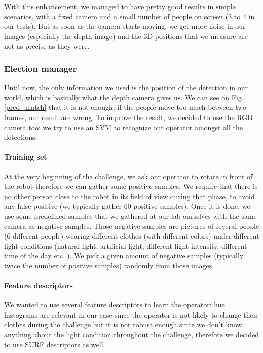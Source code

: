 \documentclass[a4paper, twocolumn]{article}
\begin{document}
    With this enhancement, we managed to have pretty good results in simple scenarios, with a fixed camera and a small number of people on screen (3 to 4 in our tests). But as soon as the camera starts moving, we get more noise in our images (especially the depth image) and the 3D positions that we measure are not as precise as they were.

    \subsubsection{Election manager}
    
    Until now, the only information we used is the position of the detection in our world, which is basically what the depth camera gives us. We can see on Fig. \ref{pred_match} that it is not enough, if the people move too much between two frames, our result are wrong. To improve the result, we decided to use the RGB camera too: we try to use an SVM to recognize our operator amongst all the detections.
    
    \paragraph{Training set} At the very beginning of the challenge, we ask our operator to rotate in front of the robot therefore we can gather some positive samples. We require that there is no other person close to the robot in its field of view during that phase, to avoid any false positive (we typically gather 60 positive samples). Once it is done, we use some predefined samples that we gathered at our lab ourselves with the same camera as negative samples. Those negative samples are pictures of several people (6 different people) wearing different clothes (with different colors) under different light conditions (natural light, artificial light, different light intensity, different time of the day etc..). We pick a given amount of negative samples (typically twice the number of positive samples) randomly from those images.
    
    \paragraph{Feature descriptors} We wanted to use several feature descriptors to learn the operator: hue histograms are relevant in our case since the operator is not likely to change their clothes during the challenge but it is not robust enough since we don't know anything about the light condition throughout the challenge, therefore we decided to use SURF descriptors \cite{BAY2008346} as well. 
    
\end{document}
